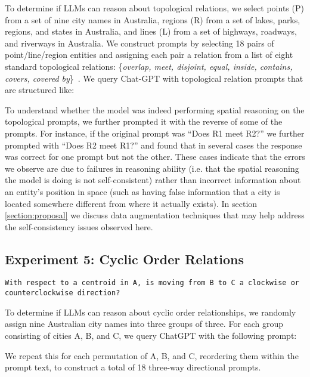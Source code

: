To determine if LLMs can reason about topological relations, we select points (P) from a set of nine city names in Australia, regions (R) from a set of lakes, parks, regions, and states in Australia, and lines (L) from a set of highways, roadways, and riverways in Australia.
We construct prompts by selecting 18 pairs of point/line/region entities and assigning each pair a relation from a list of eight standard topological relations: \{\textit{overlap, meet, disjoint, equal, inside, contains, covers, covered by}\}~\cite{Carniel2023}.
We query Chat-GPT with topological relation prompts that are structured like:
\begin{center}
\end{center}


To understand whether the model was indeed performing spatial reasoning on the topological prompts, we further prompted it with the reverse of some of the prompts.
For instance, if the original prompt was ``Does R1 meet R2?'' we further prompted with ``Does R2 meet R1?'' and found that in several cases the response was correct for one prompt but not the other.
These cases indicate that the errors we observe are due to failures in reasoning ability (i.e. that the spatial reasoning the model is doing is not self-consistent) rather than incorrect information about an entity's position in space (such as having false information that a city is located somewhere different from where it actually exists).
In section \ref{section:proposal} we discuss data augmentation techniques that may help address the self-consistency issues observed here.



\subsection{Experiment 5: Cyclic Order Relations}

\begin{lstlisting}[title=text here]
    With respect to a centroid in A, is moving from B to C a clockwise or counterclockwise direction?
\end{lstlisting}

To determine if LLMs can reason about cyclic order relationships, we randomly assign nine Australian city names into three groups of three.
For each group consisting of cities A, B, and C, we query ChatGPT with the following prompt: 
\begin{center}
\end{center}
We repeat this for each permutation of A, B, and C, reordering them within the prompt text, to construct a total of 18 three-way directional prompts.


